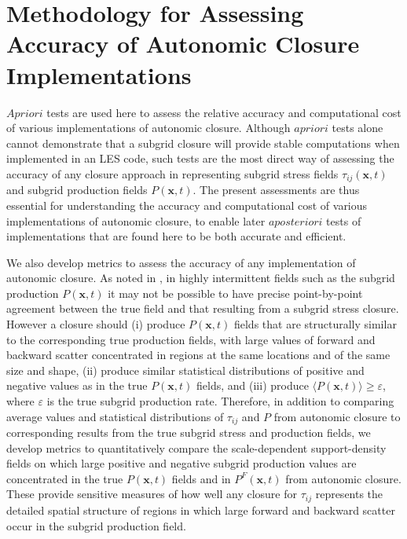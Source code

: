 \graphicspath{ {./Ch4/}  } 

%


%


\chapter{Methodology for Assessing Accuracy of Autonomic Closure Implementations}
\label{ch:4}

$A priori$ tests are used here to assess the relative accuracy and computational cost of various implementations of autonomic closure. Although $a priori$ tests alone cannot demonstrate that a subgrid closure will provide stable computations when implemented in an LES code, such tests are the most direct way of assessing the accuracy of any closure approach in representing subgrid stress fields $\tau_{ij}(\mathbf{x},t)$  and subgrid production fields $P(\mathbf{x},t)$. The present assessments are thus essential for understanding the accuracy and computational cost of various implementations of autonomic closure, to enable later $a posteriori$ tests of implementations that are found here to be both accurate and efficient. 

We also develop metrics to assess the accuracy of any implementation of autonomic closure. As noted in , in highly intermittent fields such as the subgrid production $P(\mathbf{x},t)$ it may not be possible to have precise point-by-point agreement between the true field and that resulting from a subgrid stress closure. However a closure should (i) produce $P(\mathbf{x},t)$  fields that are structurally similar to the corresponding true production fields, with large values of forward and backward scatter concentrated in regions at the same locations and of the same size and shape, (ii) produce similar statistical distributions of positive and negative values as in the true  $P(\mathbf{x},t)$ fields, and (iii) produce $\langle P(\mathbf{x},t) \rangle \geq \varepsilon$, where  $\varepsilon$ is the true subgrid production rate. Therefore, in addition to comparing average values and statistical distributions of $\tau_{ij}$ and $P$ from autonomic closure to corresponding results from the true subgrid stress and production fields, we develop metrics to quantitatively compare the scale-dependent support-density fields on which large positive and negative subgrid production values are concentrated in the true $P(\mathbf{x},t)$  fields and in  $P^{F}(\mathbf{x},t)$ from autonomic closure. These provide sensitive measures of how well any closure for $\tau_{ij}$  represents the detailed spatial structure of regions in which large forward and backward scatter occur in the subgrid production field.
 
